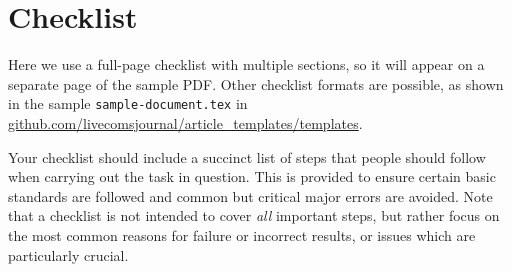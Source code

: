 \documentclass[9pt,bestpractices]{livecoms}
\begin{document}
\section{Checklist}
Here we use a full-page checklist with multiple sections, so it will appear on a separate page of the sample PDF.
Other checklist formats are possible, as shown in the sample \texttt{sample-document.tex} in \url{github.com/livecomsjournal/article_templates/templates}.

Your checklist should include a succinct list of steps that people should follow when carrying out the task in question.
This is provided to ensure certain basic standards are followed and common but critical major errors are avoided.
Note that a checklist is not intended to cover \emph{all} important steps, but rather focus on the most common reasons for failure or incorrect results, or issues which are particularly crucial.
\end{document}
